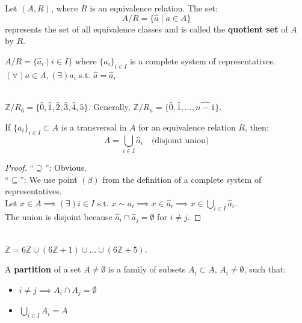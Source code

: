 \begin{definition}
Let $(A, R)$, where $R$ is an equivalence relation. The set:
$$ A/R = \{\hat{a} \mid a \in A\} $$
represents the set of all equivalence classes and is called the \textbf{quotient set} of $A$ by $R$.
\end{definition}

\begin{proposition}
$A/R = \{\hat{a}_i \mid i \in I\}$ where $\{a_i\}_{i \in I}$ is a complete system of representatives. \\
$(\forall) a \in A, (\exists) a_i$ s.t. $\hat{a} = \hat{a}_i$.
\end{proposition}

\begin{example}\mbox{}\\
$\mathbb{Z}/R_6 = \{\hat{0}, \hat{1}, \hat{2}, \hat{3}, \hat{4}, \hat{5}\}$. Generally, $\mathbb{Z}/R_n = \{\hat{0}, \hat{1}, \dots, \widehat{n-1}\}$.
\end{example}

\begin{remark}
If $\{a_i\}_{i \in I} \subset A$ is a transversal in $A$ for an equivalence relation $R$, then:
$$ A = \bigcup_{i \in I} \hat{a}_i \quad \text{(disjoint union)} $$
\end{remark}

\begin{proof}
``$\supseteq$'': Obvious. \\
``$\subseteq$'': We use point $(\beta)$ from the definition of a complete system of representatives. \\
Let $x \in A \implies (\exists) i \in I \text{ s.t. } x \sim a_i \implies x \in \hat{a}_i \implies x \in \bigcup_{i \in I} \hat{a}_i$. \\
The union is disjoint because $\hat{a}_i \cap \hat{a}_j = \emptyset$ for $i \neq j$.
\end{proof}


\begin{example}\mbox{}\\
$\mathbb{Z} = 6\mathbb{Z} \cup (6\mathbb{Z}+1) \cup \dots \cup (6\mathbb{Z}+5)$.
\end{example}


\begin{definition}
A \textbf{partition} of a set $A \neq \emptyset$ is a family of subsets $A_i \subset A$, $A_i \neq \emptyset$, such that:
\begin{itemize}
    \item $i \neq j \implies A_i \cap A_j = \emptyset$
    \item $\bigcup_{i \in I} A_i = A$
\end{itemize}

\begin{center}
\end{center}
\end{definition}

